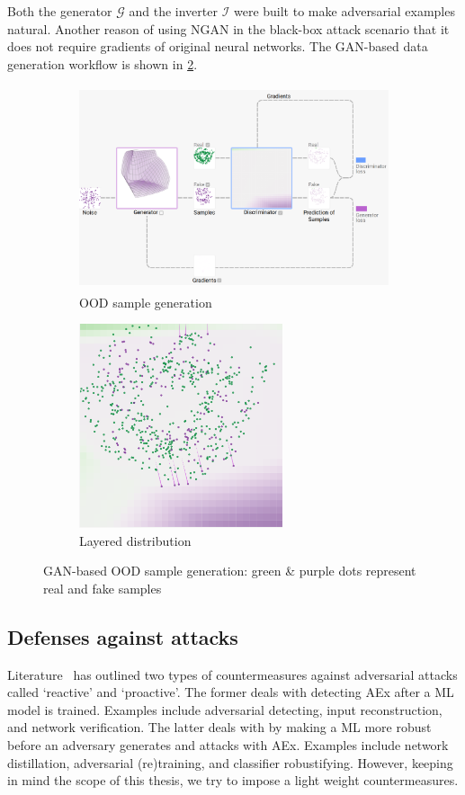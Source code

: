 \hspace*{3.5mm}Both the generator $\mathcal{G}$ and the inverter $\mathcal{I}$ were built to make adversarial examples natural. Another reason of using NGAN in the black-box attack scenario that it does not require gradients of original neural networks. The GAN-based data generation workflow is shown in \cref{fig:OOD_GAN_generation}. 

\begin{figure}
	\centering
	\begin{subfigure}{.61\linewidth}
		\centering
		\includegraphics[width=\linewidth,height=60mm]{images/gan_sg.png}
		\caption{OOD sample generation}
        \label{fig:ood_sample-generation}
	\end{subfigure}
	\begin{subfigure}{0.35\linewidth}
		\centering
		\includegraphics[width=\linewidth,height=60mm]{images/ld.png}
		\caption{Layered distribution}
	\end{subfigure}
	\caption{GAN-based OOD sample generation: green \& purple dots represent real and fake samples~\cite{kahng2018gan}} 
	\label{fig:OOD_GAN_generation}
\end{figure}
\fi 

\subsection{Defenses against attacks}
Literature~\cite{OOD19} has outlined two types of countermeasures against adversarial attacks called `reactive' and `proactive'. The former deals with detecting AEx after a ML model is trained. Examples include adversarial detecting, input reconstruction, and network verification. The latter deals with by making a ML more robust before an adversary generates and attacks with AEx. Examples include network distillation, adversarial (re)training, and classifier robustifying. However, keeping in mind the scope of this thesis, we try to impose a light weight countermeasures. 

